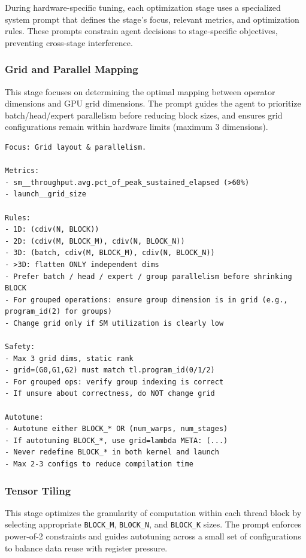 During hardware-specific tuning, each optimization stage uses a specialized system prompt that defines the stage's focus, relevant metrics, and optimization rules. These prompts constrain agent decisions to stage-specific objectives, preventing cross-stage interference.

\subsubsection{Grid and Parallel Mapping}

This stage focuses on determining the optimal mapping between operator dimensions and GPU grid dimensions. The prompt guides the agent to prioritize batch/head/expert parallelism before reducing block sizes, and ensures grid configurations remain within hardware limits (maximum 3 dimensions).

\begin{mdframed}[linewidth=1pt, linecolor=black, backgroundcolor=gray!5]
\begin{lstlisting}
Focus: Grid layout & parallelism.

Metrics:
- sm__throughput.avg.pct_of_peak_sustained_elapsed (>60%)
- launch__grid_size

Rules:
- 1D: (cdiv(N, BLOCK))
- 2D: (cdiv(M, BLOCK_M), cdiv(N, BLOCK_N))
- 3D: (batch, cdiv(M, BLOCK_M), cdiv(N, BLOCK_N))
- >3D: flatten ONLY independent dims
- Prefer batch / head / expert / group parallelism before shrinking BLOCK
- For grouped operations: ensure group dimension is in grid (e.g., program_id(2) for groups)
- Change grid only if SM utilization is clearly low

Safety:
- Max 3 grid dims, static rank
- grid=(G0,G1,G2) must match tl.program_id(0/1/2)
- For grouped ops: verify group indexing is correct
- If unsure about correctness, do NOT change grid

Autotune:
- Autotune either BLOCK_* OR (num_warps, num_stages)
- If autotuning BLOCK_*, use grid=lambda META: (...)
- Never redefine BLOCK_* in both kernel and launch
- Max 2-3 configs to reduce compilation time
\end{lstlisting}
\end{mdframed}

\subsubsection{Tensor Tiling}

This stage optimizes the granularity of computation within each thread block by selecting appropriate \texttt{BLOCK\_M}, \texttt{BLOCK\_N}, and \texttt{BLOCK\_K} sizes. The prompt enforces power-of-2 constraints and guides autotuning across a small set of configurations to balance data reuse with register pressure.

